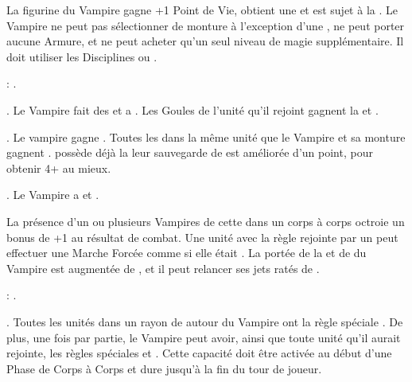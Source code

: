 \endpricelist


\noindent\parbox{\columnwidth}{
La figurine du Vampire \strigoi{} gagne +1 Point de Vie, obtient une  et est sujet à la \hatred{}. Le Vampire ne peut pas sélectionner de monture à l'exception d'une \shriekinghorror{}, ne peut porter aucune Armure, et ne peut acheter qu'un seul niveau de magie supplémentaire. Il doit utiliser les Disciplines \wilderness{} ou \necromancy{}.

\bloodties{}: \ghouls{}.
}

\startpricelist

 \textbf{\ancientbloodpower}. Le Vampire fait des \poisonedattacks{} et a . Les Goules de l'unité qu'il rejoint gagnent la \hatred{} et .

 \textbf{\bloodlinepower}. Le vampire gagne . Toutes les \ghouls{} dans la même unité que le Vampire et sa monture gagnent .  possède déjà la \regeneration{} leur sauvegarde de \regeneration{} est améliorée d'un point, pour obtenir 4+ au mieux.

 \textbf{\bloodlinepower}. Le Vampire a \thunderouscharge{} et .

\endpricelist

\separator


\noindent\parbox{\columnwidth}{
La présence d'un ou plusieurs Vampires de cette \bloodline{} dans un corps à corps octroie un bonus de +1 au résultat de combat. Une unité avec la règle \undead{} rejointe par un \vonkarnstein{} peut effectuer une Marche Forcée comme si elle était \vampiric{}. La portée de la \inspiringpresence{} et de \holdyourground{} du Vampire est augmentée de , et il peut relancer ses jets ratés de \vampiric{}. 

\bloodties{}: \darkcoach{}.
}

\startpricelist

 \textbf{\ancientbloodpower}. Toutes les unités dans un rayon de  autour du Vampire ont la règle spéciale \hardtarget{}. De plus, une fois par partie, le Vampire peut avoir, ainsi que toute unité qu'il aurait rejointe, les règles spéciales \lightningattacks{} et . Cette capacité doit être activée au début d'une Phase de Corps à Corps et dure jusqu'à la fin du tour de joueur.

